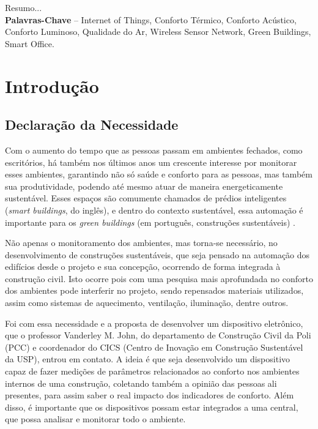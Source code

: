 \documentclass[]{politex}
\begin{document}
\capa
\folhaderosto


\begin{resumo}
Resumo...
%
\\[3\baselineskip]
%
\textbf{Palavras-Chave} -- Internet of Things, Conforto Térmico, Conforto Acústico, Conforto Luminoso, Qualidade do Ar, Wireless Sensor Network, Green Buildings, Smart Office.
\end{resumo}


\sumario


\part{Introdução}

\chapter{Declaração da Necessidade}

Com o aumento do tempo que as pessoas passam em ambientes fechados, como escritórios, há também nos últimos anos um crescente interesse por monitorar esses ambientes, garantindo não só saúde e conforto para as pessoas, mas também sua produtividade, podendo até mesmo atuar de maneira energeticamente sustentável. Esses espaços são comumente chamados de prédios inteligentes (\textit{smart buildings}, do inglês), e dentro do contexto sustentável, essa automação é importante para os \textit{green buildings} (em português, construções sustentáveis) \cite{GreenBuildings} \cite{EnergyBuildings}. 

Não apenas o monitoramento dos ambientes, mas torna-se necessário, no desenvolvimento de construções sustentáveis, que seja pensado na automação dos edifícios desde o projeto e sua concepção, ocorrendo de forma integrada à construção civil. Isto ocorre pois com uma pesquisa mais aprofundada no conforto dos ambientes pode interferir no projeto, sendo repensados materiais utilizados, assim como sistemas de aquecimento, ventilação, iluminação, dentre outros. 

Foi com essa necessidade e a proposta de desenvolver um dispositivo eletrônico, que o professor Vanderley M. John, do departamento de Construção Civil da Poli (PCC) e coordenador do CICS (Centro de Inovação em Construção Sustentável da USP)\cite{CICS}, entrou em contato. A ideia é que seja desenvolvido um dispositivo capaz de fazer medições de parâmetros relacionados ao conforto nos ambientes internos de uma construção, coletando também a opinião das pessoas ali presentes, para assim saber o real impacto dos indicadores de conforto. Além disso, é importante que os dispositivos possam estar integrados a uma central, que possa analisar e monitorar todo o ambiente. 
\end{document}
